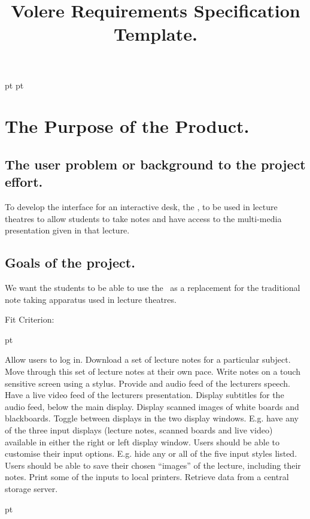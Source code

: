  pt
 pt

\title{Volere Requirements Specification Template.}

\mainfont


\section{The Purpose of the Product.}

\subsection{The user problem or background to the project effort.}

To develop the interface for an interactive desk, the \iDesk, to be used in lecture theatres to allow students to take notes and have access to the multi-media presentation given in that lecture.

\subsection{Goals of the project.}

We want the students to be able to use the \iDesk\ as a replacement for the traditional note taking apparatus used in lecture theatres.

Fit Criterion:

 pt

\items Allow users to log in.
\items Download a set of lecture notes for a particular subject.
\items Move through this set of lecture notes at their own pace.
\items Write notes on a touch sensitive screen using a stylus.
\items Provide and audio feed of the lecturers speech.
\items Have a live video feed of the lecturers presentation.
\items Display subtitles for the audio feed, below the main display.
\items Display scanned images of white boards and blackboards.
\items Toggle between displays in the two display windows. E.g. have any of the three input displays (lecture notes, scanned boards and live video) available in either the right or left display window.
\items Users should be able to customise their input options. E.g. hide any or all of the five input styles listed.
\items Users should be able to save their chosen ``images'' of the lecture, including their notes.
\items Print some of the inputs to local printers.
\items Retrieve data from a central storage server.

 pt

